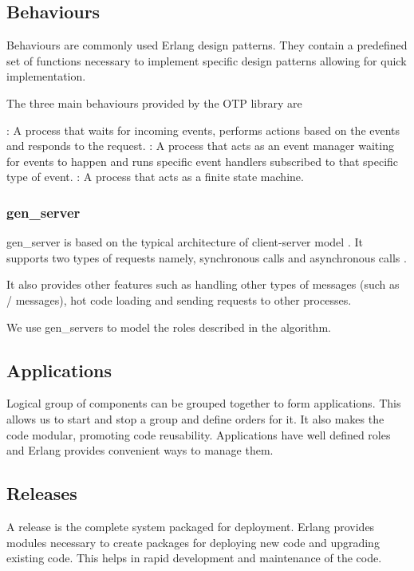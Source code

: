 \subsection{Behaviours}
\label{section:concepts.behaviours}
Behaviours are commonly used Erlang design patterns. They contain a predefined
set of functions necessary to implement specific design patterns allowing for
quick implementation.

The three main behaviours provided by the OTP library are

\begin{itemize}
    : A process that waits for incoming events, performs
    actions based on the events and responds to the request.
    : A process that acts as an event manager waiting for
    events to happen and runs specific event handlers subscribed to that
    specific type of event.
    : A process that acts as a finite state machine.
\end{itemize}

\subsubsection{gen\_server}
\label{section:gen.server}

gen\_server is based on the typical architecture of client-server model
\citep{reliable.dist.sys}. It supports two types of requests namely, synchronous
calls%
and asynchronous calls%
.

It also provides other features such as handling other types of messages (such
as / messages), hot code loading and sending requests to
other processes.

We use gen\_servers to model the roles described in the algorithm.

\subsection{Applications}
\label{section:concepts.applications}
Logical group of components can be grouped together to form applications.
This allows us to start and stop a group and define orders for it. It also
makes the code modular, promoting code reusability. Applications have
well defined roles and Erlang provides convenient ways to
manage them.

\subsection{Releases}
\label{section:concepts.releases}
A release is the complete system packaged for deployment. Erlang provides
modules necessary to create packages for deploying new code and upgrading
existing code. This helps in rapid development and maintenance of the code.


